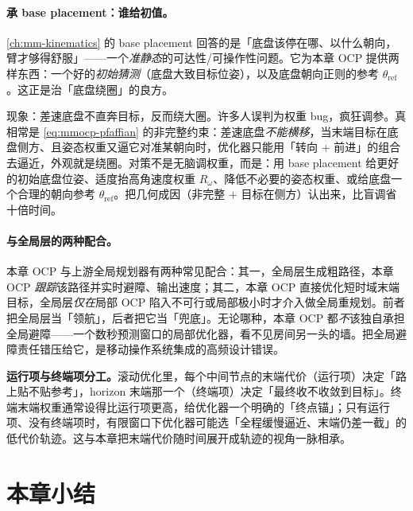\paragraph{承 base placement：谁给初值。}
\cref{ch:mm-kinematics} 的 base placement 回答的是「底盘该停在哪、以什么朝向，臂才够得舒服」——一个\emph{准静态}的可达性/可操作性问题。它为本章 OCP 提供两样东西：一个好的\emph{初始猜测}（底盘大致目标位姿），以及底盘朝向正则的参考 $\theta_{\text{ref}}$。这正是治「底盘绕圈」的良方。

\begin{pitfall}
现象：差速底盘不直奔目标，反而绕大圈。许多人误判为权重 bug，疯狂调参。真相常是 \cref{eq:mmocp-pfaffian} 的非完整约束：差速底盘\emph{不能横移}，当末端目标在底盘侧方、且姿态权重又逼它对准某朝向时，优化器只能用「转向 $+$ 前进」的组合去逼近，外观就是绕圈。对策不是无脑调权重，而是：用 base placement 给更好的初始底盘位姿、适度抬高角速度权重 $R_\omega$、降低不必要的姿态权重、或给底盘一个合理的朝向参考 $\theta_{\text{ref}}$。把几何成因（非完整 $+$ 目标在侧方）认出来，比盲调省十倍时间。
\end{pitfall}

\paragraph{与全局层的两种配合。}
本章 OCP 与上游全局规划器有两种常见配合：其一，全局层生成粗路径，本章 OCP \emph{跟踪}该路径并实时避障、输出速度；其二，本章 OCP 直接优化短时域末端目标，全局层\emph{仅在}局部 OCP 陷入不可行或局部极小时才介入做全局重规划。前者把全局层当「领航」，后者把它当「兜底」。无论哪种，本章 OCP 都\emph{不}该独自承担全局避障——一个数秒预测窗口的局部优化器，看不见房间另一头的墙。把全局避障责任错压给它，是移动操作系统集成的高频设计错误。

\begin{insight}
\textbf{运行项与终端项分工。}\;滚动优化里，每个中间节点的末端代价（运行项）决定「路上贴不贴参考」，horizon 末端那一个（终端项）决定「最终收不收敛到目标」。终端末端权重通常设得比运行项更高，给优化器一个明确的「终点锚」；只有运行项、没有终端项时，有限窗口下优化器可能选「全程缓慢逼近、末端仍差一截」的低代价轨迹。这与本章把末端代价随时间展开成轨迹的视角一脉相承。
\end{insight}

\section*{本章小结}

